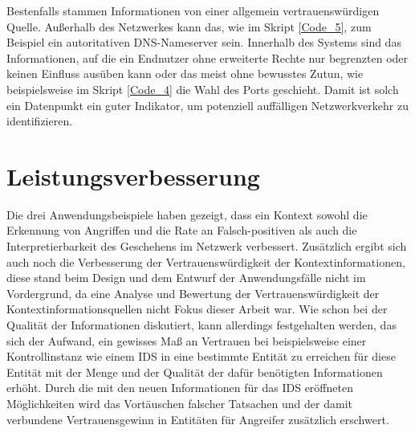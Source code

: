 Bestenfalls stammen Informationen von einer allgemein vertrauenswürdigen Quelle. Außerhalb des Netzwerkes kann das, wie im Skript \ref{Code_5}, zum Beispiel ein autoritativen DNS-Nameserver sein. Innerhalb des Systems sind das Informationen, auf die ein Endnutzer ohne erweiterte Rechte nur begrenzten oder keinen Einfluss ausüben kann oder das meist ohne bewusstes Zutun, wie beispielsweise im Skript \ref{Code_4} die Wahl des Ports geschieht. Damit ist solch ein Datenpunkt ein guter Indikator, um potenziell auffälligen Netzwerkverkehr zu identifizieren.
\section{Leistungsverbesserung}
Die drei Anwendungsbeispiele haben gezeigt, dass ein Kontext sowohl die Erkennung von Angriffen und die Rate an Falsch-positiven als auch die Interpretierbarkeit des Geschehens im Netzwerk verbessert.
Zusätzlich ergibt sich auch noch die Verbesserung der Vertrauenswürdigkeit der Kontextinformationen, diese stand beim Design und dem Entwurf der Anwendungsfälle nicht im Vordergrund, da eine Analyse und Bewertung der Vertrauenswürdigkeit der Kontextinformationsquellen nicht Fokus dieser Arbeit war. Wie schon bei der Qualität der Informationen diskutiert, kann allerdings festgehalten werden, das sich der Aufwand, ein gewisses Maß an Vertrauen bei beispielsweise einer Kontrollinstanz wie einem IDS in eine bestimmte Entität zu erreichen für diese Entität mit der Menge und der Qualität der dafür benötigten Informationen erhöht. Durch die mit den neuen Informationen für das IDS eröffneten Möglichkeiten wird das Vortäuschen falscher Tatsachen und der damit verbundene Vertrauensgewinn in Entitäten für Angreifer zusätzlich erschwert.